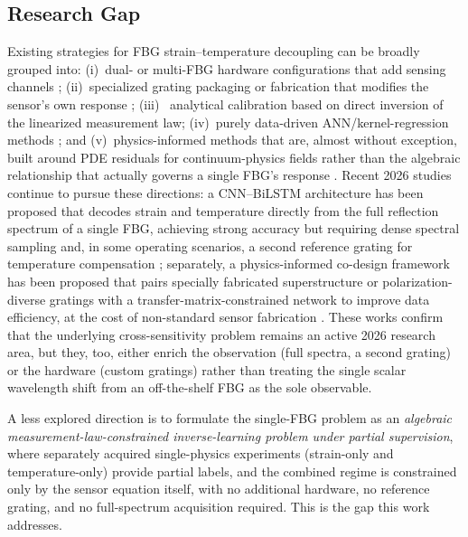 \documentclass[journal,twoside,web]{ieeecolor}
\begin{document}
\subsection{Research Gap}

Existing strategies for FBG strain--temperature decoupling can be broadly
grouped into: (i)~dual- or multi-FBG hardware configurations that add
sensing channels \cite{b11,b14,b15}; (ii)~specialized grating packaging or
fabrication that modifies the sensor's own response \cite{b18,b20}; (iii)~
analytical calibration based on direct inversion of the linearized
measurement law; (iv)~purely data-driven ANN/kernel-regression methods
\cite{b19,b21,b22}; and (v)~physics-informed methods that are, almost
without exception, built around PDE residuals for continuum-physics fields
rather than the algebraic relationship that actually governs a single FBG's
response \cite{b26,b27,b32}. Recent 2026 studies continue to pursue these
directions: a CNN--BiLSTM architecture has been proposed that decodes strain
and temperature directly from the full reflection spectrum of a single FBG,
achieving strong accuracy but requiring dense spectral sampling and, in some
operating scenarios, a second reference grating for temperature compensation
\cite{b38}; separately, a physics-informed co-design framework has been
proposed that pairs specially fabricated superstructure or
polarization-diverse gratings with a transfer-matrix-constrained network to
improve data efficiency, at the cost of non-standard sensor fabrication
\cite{b39}. These works confirm that the underlying cross-sensitivity
problem remains an active 2026 research area, but they, too, either enrich
the observation (full spectra, a second grating) or the hardware (custom
gratings) rather than treating the single scalar wavelength shift from an
off-the-shelf FBG as the sole observable.

A less explored direction is to formulate the single-FBG problem as an
\emph{algebraic measurement-law-constrained inverse-learning problem under
partial supervision}, where separately acquired single-physics experiments
(strain-only and temperature-only) provide partial labels, and the combined
regime is constrained only by the sensor equation itself, with no additional
hardware, no reference grating, and no full-spectrum acquisition required.
This is the gap this work addresses.
\end{document}
